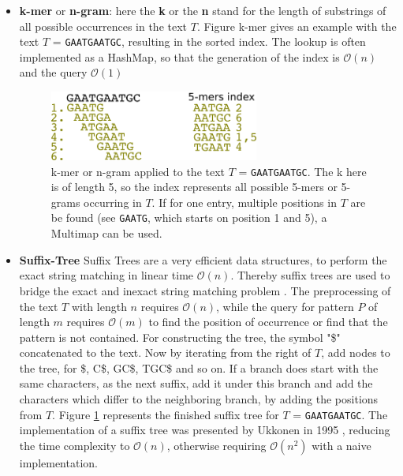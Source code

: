 \begin{itemize}
\item \textbf{k-mer} or \textbf{n-gram}: here the \textbf{k} or the \textbf{n} stand for the length of substrings of all possible occurrences in the text $T$. Figure k-mer gives an example with the text $T$ = \texttt{GAATGAATGC}, resulting in the sorted index. The lookup is often implemented as a HashMap, so that the generation of the index is $\mathcal{O}({n})$ and the query $\mathcal{O}({1})$
\begin{figure}[!ht]
\label{fig:k-mer}
    \centering
    \includegraphics[width=0.65\textwidth]{images/k-mer.png}
    \caption[k-mer or n-gram]{k-mer or n-gram applied to the text  $T$ = \texttt{GAATGAATGC}. The k here is of length 5, so the index represents all possible 5-mers or 5-grams occurring in $T$. If for one entry, multiple positions in $T$ are be found (see \texttt{GAATG}, which starts on position 1 and 5), a Multimap can be used.}
\end{figure}
\item \textbf{Suffix-Tree}
Suffix Trees are a very efficient data structures, to perform the exact string matching in linear time $\mathcal{O}({n})$. Thereby suffix trees are used to bridge the exact and inexact string matching problem \cite{Gusfield1997}. The preprocessing of the text $T$ with length $n$ requires  $\mathcal{O}({n})$, while the query for pattern $P$ of length $m$ requires $\mathcal{O}({m})$ to find the position of occurrence or find that the pattern is not contained. For constructing the tree, the symbol "\$" concatenated to the text. Now by iterating from the right of $T$, add nodes to the tree, for \$, C\$, GC\$, TGC\$ and so on. If a branch does start with the same characters, as the next suffix, add it under this branch and add the characters which differ to the neighboring branch, by adding the positions from $T$. Figure \ref{fig:k-mer} represents the finished suffix tree for  $T$ = \texttt{GAATGAATGC}. The implementation of a suffix tree was presented by Ukkonen in 1995 \cite{Ukkonen1995}, reducing the time complexity to $\mathcal{O}({n})$, otherwise requiring $\mathcal{O}({n^2})$ with a naive implementation.
\begin{figure}[!ht]

\end{figure}
\end{itemize}
